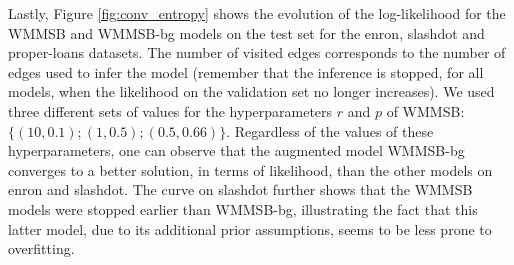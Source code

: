 Lastly, Figure \ref{fig:conv_entropy} shows the evolution of the log-likelihood for the WMMSB and WMMSB-bg models on the test set for the enron, slashdot and proper-loans datasets. The number of visited edges corresponds to the number of edges used to infer the model (remember that the inference is stopped, for all models, when the likelihood  on the validation set no longer increases). We used three different sets of values for the hyperparameters $r$ and $p$ of WMMSB: $\{(10,0.1); (1,0.5); (0.5,0.66)\}$. Regardless of the values of these hyperparameters, one can observe that the augmented model WMMSB-bg converges to a better solution, in terms of likelihood, than the other models on enron and slashdot. The curve on slashdot further shows that the WMMSB models were stopped earlier than WMMSB-bg, illustrating the fact that this latter model, due to its additional prior assumptions, seems to be less prone to overfitting.









